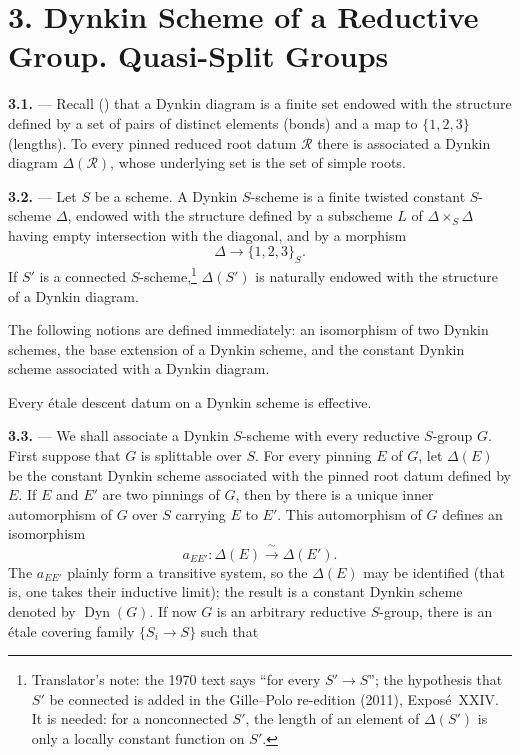 \section*{3. Dynkin Scheme of a Reductive Group. Quasi-Split Groups}

\medskip\noindent\textbf{3.1.} ---
Recall () that a Dynkin diagram is a finite set endowed
with the structure defined by a set of pairs of distinct elements
(bonds) and a map to \(\{1,2,3\}\) (lengths). To every pinned reduced
root datum \(\mathscr R\) there is associated a Dynkin diagram
\(\Delta(\mathscr R)\), whose underlying set is the set of simple
roots.

\medskip\noindent\textbf{3.2.} ---
Let \(S\) be a scheme. A Dynkin \(S\)-scheme is a finite twisted
constant \(S\)-scheme \(\Delta\), endowed with the structure defined
by a subscheme \(L\) of \(\Delta\times_S\Delta\) having empty
intersection with the diagonal, and by a morphism
\[
  \Delta\longrightarrow\{1,2,3\}_S.
\]
If \(S'\) is a connected \(S\)-scheme,\footnote{Translator's note: the 1970 text says
``for every \(S'\to S\)''; the hypothesis that \(S'\) be connected is added in the Gille--Polo
re-edition (2011), Exposé~XXIV. It is needed: for a nonconnected \(S'\), the length of an
element of \(\Delta(S')\) is only a locally constant function on \(S'\).}
\(\Delta(S')\) is naturally endowed with the structure of a Dynkin
diagram.

The following notions are defined immediately: an isomorphism of two
Dynkin schemes, the base extension of a Dynkin scheme, and the
constant Dynkin scheme associated with a Dynkin diagram.

Every étale descent datum on a Dynkin scheme is effective.

\medskip\noindent\textbf{3.3.} ---
We shall associate a Dynkin \(S\)-scheme with every reductive
\(S\)-group \(G\). First suppose that \(G\) is splittable over \(S\).
For every pinning \(E\) of \(G\), let \(\Delta(E)\) be the constant
Dynkin scheme associated with the pinned root datum defined by \(E\).
If \(E\) and \(E'\) are two pinnings of \(G\), then by  there is
a unique inner automorphism of \(G\) over \(S\) carrying \(E\) to
\(E'\). This automorphism of \(G\) defines an isomorphism
\[
  a_{EE'}:\Delta(E)\xrightarrow{\ \sim\ }\Delta(E').
\]
The \(a_{EE'}\) plainly form a transitive system, so the
\(\Delta(E)\) may be identified (that is, one takes their inductive
limit); the result is a constant Dynkin scheme denoted by
\(\operatorname{Dyn}(G)\). If now \(G\) is an arbitrary reductive
\(S\)-group, there is an étale covering family \(\{S_i\to S\}\)
such that


